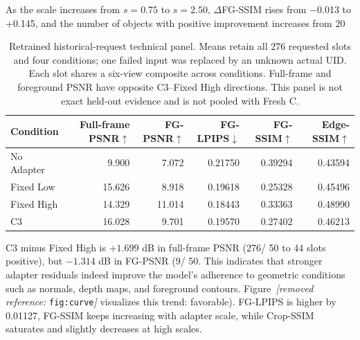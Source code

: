 \documentclass[times,twocolumn,final]{elsarticle}
\providecommand{\DIFadd}[1]{{\protect\color{blue} \sf #1}} %
\providecommand{\DIFdel}[1]{{\protect\color{red} \scriptsize #1}} %
\providecommand{\DIFaddbegin}{} %
\providecommand{\DIFaddend}{} %
\providecommand{\DIFdelbegin}{} %
\providecommand{\DIFdelend}{} %
\begin{document}
\DIFdelbegin \DIFdel{As the scale increases from $s = 0.75$ to $s = 2.50$, $\Delta$FG-SSIM rises from $-$0.013 to +0.145, and the number of objects with positive improvement increases from 20}\DIFdelend \DIFaddbegin \begin{table}[t]
\centering\scriptsize\setlength{\tabcolsep}{5pt}
\caption{Retrained historical-request technical panel. Means retain all 276 requested slots and four conditions; one failed input was replaced by an unknown actual UID. Each slot shares a six-view composite across conditions. Full-frame and foreground PSNR have opposite C3--Fixed High directions. This panel is not exact held-out evidence and is not pooled with Fresh C.}
\label{tab:original276}
\begin{tabular}{lrrrrr}
\toprule Condition & Full-frame PSNR$\uparrow$ & FG-PSNR$\uparrow$ & FG-LPIPS$\downarrow$ & FG-SSIM$\uparrow$ & Edge-SSIM$\uparrow$ \\
\midrule
No Adapter & 9.900 & 7.072 & 0.21750 & 0.39294 & 0.43594 \\
Fixed Low & 15.626 & 8.918 & 0.19618 & 0.25328 & 0.45496 \\
Fixed High & 14.329 & 11.014 & 0.18443 & 0.33363 & 0.48990 \\
C3 & 16.028 & 9.701 & 0.19570 & 0.27402 & 0.46213 \\

\bottomrule
\end{tabular}
\end{table}

\DIFadd{C3 minus Fixed High is $+1.699$ dB in full-frame PSNR (276}\DIFaddend /\DIFdelbegin \DIFdel{50 to 44}\DIFdelend \DIFaddbegin \DIFadd{276 slots positive), but $-1.314$ dB in FG-PSNR (9}\DIFaddend /\DIFdelbegin \DIFdel{50. This indicates that stronger adapter residuals indeed improve the model's adherence to geometric conditions such as normals, depth maps, and foreground contours. Figure~\textit{[removed reference: }\texttt{fig:curve}\textit{]} visualizes this trend: }\DIFdelend \DIFaddbegin \DIFadd{276 favorable). FG-LPIPS is higher by 0.01127, }\DIFaddend FG-SSIM \DIFdelbegin \DIFdel{keeps increasing with adapter scale, while Crop-SSIM saturates and slightly decreases at high scales. }%
\end{document}
